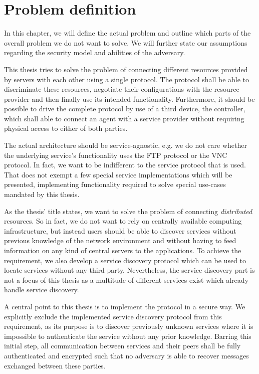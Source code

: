\chapter{Problem definition}

In this chapter, we will define the actual problem and outline which parts of the overall problem we do not want to solve.
We will further state our assumptions regarding the security model and abilities of the adversary.

This thesis tries to solve the problem of connecting different resources provided by servers with each other using a single protocol.
The protocol shall be able to discriminate these resources, negotiate their configurations with the resource provider and then finally use its intended functionality.
Furthermore, it should be possible to drive the complete protocol by use of a third device, the controller, which shall able to connect an agent with a service provider without requiring physical access to either of both parties.

The actual architecture should be service-agnostic, e.g. we do not care whether the underlying service's functionality uses the FTP protocol or the VNC protocol.
In fact, we want to be indifferent to the service protocol that is used.
That does not exempt a few special service implementations which will be presented, implementing functionality required to solve special use-cases mandated by this thesis.

As the thesis' title states, we want to solve the problem of connecting \emph{distributed} resources.
So in fact, we do not want to rely on centrally available computing infrastructure, but instead users should be able to discover services without previous knowledge of the network environment and without having to feed information on  any kind of central servers to the applications.
To achieve the requirement, we also develop a service discovery protocol which can be used to locate services without any third party.
Nevertheless, the service discovery part is not a focus of this thesis as a multitude of different services exist which already handle service discovery.

A central point to this thesis is to implement the protocol in a secure way.
We explicitly exclude the implemented service discovery protocol from this requirement, as its purpose is to discover previously unknown services where it is impossible to authenticate the service without any prior knowledge.
Barring this initial step, all communication between services and their peers shall be fully authenticated and encrypted such that no adversary is able to recover messages exchanged between these parties.

